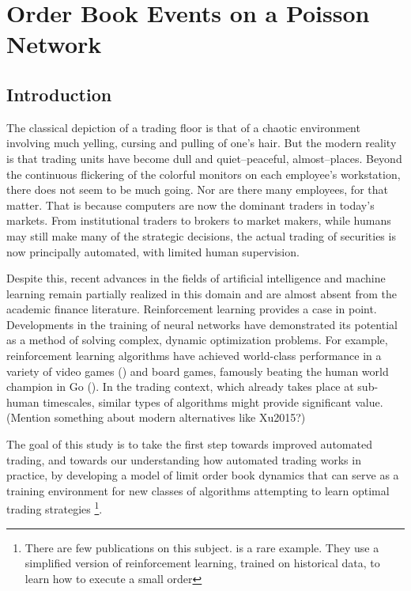 \chapter{Order Book Events on a Poisson Network}
\label{chapter:four}

\section{Introduction}
The classical depiction of a trading floor is that of a chaotic environment involving much yelling, cursing and pulling of one's hair. But the modern reality is that trading units have become dull and quiet--peaceful, almost--places. Beyond the continuous flickering of the colorful monitors on each employee's workstation, there does not seem to be much going. Nor are there many employees, for that matter. That is because computers are now the dominant traders in today's markets. From institutional traders to brokers to market makers, while humans may still make many of the strategic decisions, the actual trading of securities is now principally automated, with limited human supervision.

Despite this, recent advances in the fields of artificial intelligence and machine learning remain partially realized in this domain and are almost absent from the academic finance literature. Reinforcement learning provides a case in point. Developments in the training of neural networks have demonstrated its potential as a method of solving complex, dynamic optimization problems. For example, reinforcement learning algorithms have achieved world-class performance in a variety of video games (\cite{Mnih2015}) and board games, famously beating the human world champion in Go (\cite{Silver2017}). In the trading context, which already takes place at sub-human timescales, similar types of algorithms might provide significant value. (Mention something about modern alternatives like Xu2015?)

The goal of this study is to take the first step towards improved automated trading, and towards our understanding how automated trading works in practice, by developing a model of limit order book dynamics that can serve as a training environment for new classes of algorithms attempting to learn optimal trading strategies \footnote{There are few publications on this subject. \cite{Nevmyvaka2006} is a rare example. They use a simplified version of reinforcement learning, trained on historical data, to learn how to execute a small order}.

